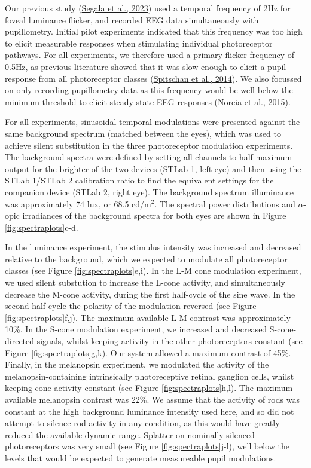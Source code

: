 \documentclass[
]{article}
\begin{document}
Our previous study (\protect\hyperlink{ref-Segala2023}{Segala et al., 2023}) used a temporal frequency of 2Hz for foveal luminance flicker, and recorded EEG data simultaneously with pupillometry. Initial pilot experiments indicated that this frequency was too high to elicit measurable responses when stimulating individual photoreceptor pathways. For all experiments, we therefore used a primary flicker frequency of 0.5Hz, as previous literature showed that it was slow enough to elicit a pupil response from all photoreceptor classes (\protect\hyperlink{ref-Spitschan2014}{Spitschan et al., 2014}). We also focussed on only recording pupillometry data as this frequency would be well below the minimum threshold to elicit steady-state EEG responses (\protect\hyperlink{ref-Norcia2015}{Norcia et al., 2015}).

For all experiments, sinusoidal temporal modulations were presented against the same background spectrum (matched between the eyes), which was used to achieve silent substitution in the three photoreceptor modulation experiments. The background spectra were defined by setting all channels to half maximum output for the brighter of the two devices (STLab 1, left eye) and then using the STLab 1/STLab 2 calibration ratio to find the equivalent settings for the companion device (STLab 2, right eye). The background spectrum illuminance was approximately 74 lux, or 68.5 cd/m\(^2\). The spectral power distributions and \(\alpha\)-opic irradiances of the background spectra for both eyes are shown in Figure \ref{fig:spectraplots}c-d.

In the luminance experiment, the stimulus intensity was increased and decreased relative to the background, which we expected to modulate all photoreceptor classes (see Figure \ref{fig:spectraplots}e,i). In the L-M cone modulation experiment, we used silent substution to increase the L-cone activity, and simultaneously decrease the M-cone activity, during the first half-cycle of the sine wave. In the second half-cycle the polarity of the modulation reversed (see Figure \ref{fig:spectraplots}f,j). The maximum available L-M contrast was approximately 10\%. In the S-cone modulation experiment, we increased and decreased S-cone-directed signals, whilst keeping activity in the other photoreceptors constant (see Figure \ref{fig:spectraplots}g,k). Our system allowed a maximum contrast of 45\%. Finally, in the melanopsin experiment, we modulated the activity of the melanopsin-containing intrinsically photoreceptive retinal ganglion cells, whilst keeping cone activity constant (see Figure \ref{fig:spectraplots}h,l). The maximum available melanopsin contrast was 22\%. We assume that the activity of rods was constant at the high background luminance intensity used here, and so did not attempt to silence rod activity in any condition, as this would have greatly reduced the available dynamic range. Splatter on nominally silenced photoreceptors was very small (see Figure \ref{fig:spectraplots}j-l), well below the levels that would be expected to generate measureable pupil modulations.
\end{document}
